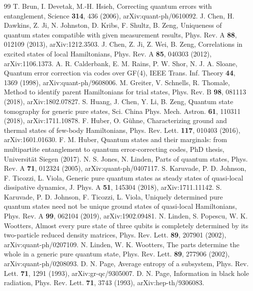 \documentclass[aps,pra,onecolumn,superscriptaddress,nofootinbib,longbibliography,10pt]{revtex4-2}
\theoremstyle{definition}
\begin{document}
\begin{thebibliography}{99}
 T. Brun, I. Devetak, M.-H. Hsieh, Correcting quantum errors with entanglement, Science \textbf{314}, 436 (2006), arXiv:quant-ph/0610092.
 J. Chen, H. Dawkins, Z. Ji, N. Johnston, D. Kribs, F. Shultz, B. Zeng, Uniqueness of quantum states compatible with given measurement results, Phys. Rev. A \textbf{88}, 012109 (2013), arXiv:1212.3503.
 J. Chen, Z. Ji, Z. Wei, B. Zeng, Correlations in excited states of local Hamiltonians, Phys. Rev. A \textbf{85}, 040303 (2012), arXiv:1106.1373.
 A. R. Calderbank, E. M. Rains, P. W. Shor, N. J. A. Sloane, Quantum error correction via codes over GF(4), IEEE Trans. Inf. Theory \textbf{44}, 1369 (1998), arXiv:quant-ph/9608006.
 M. Greiter, V. Schnells, R. Thomale, Method to identify parent Hamiltonians for trial states, Phys. Rev. B \textbf{98}, 081113 (2018), arXiv:1802.07827.
 S. Huang, J. Chen, Y. Li, B. Zeng, Quantum state tomography for generic pure states, Sci. China Phys. Mech. Astron. \textbf{61}, 110311 (2018), arXiv:1711.10878.
 F. Huber, O. Gühne, Characterizing ground and thermal states of few-body Hamiltonians, Phys. Rev. Lett. \textbf{117}, 010403 (2016), arXiv:1601.01630.
 F. M. Huber, Quantum states and their marginals: from multipartite entanglement to quantum error-correcting codes, PhD thesis, Universität Siegen (2017).
 N. S. Jones, N. Linden, Parts of quantum states, Phys. Rev. A \textbf{71}, 012324 (2005), arXiv:quant-ph/0407117.
 S. Karuvade, P. D. Johnson, F. Ticozzi, L. Viola, Generic pure quantum states as steady states of quasi-local dissipative dynamics, J. Phys. A \textbf{51}, 145304 (2018), arXiv:1711.11142.
 S. Karuvade, P. D. Johnson, F. Ticozzi, L. Viola, Uniquely determined pure quantum states need not be unique ground states of quasi-local Hamiltonians, Phys. Rev. A \textbf{99}, 062104 (2019), arXiv:1902.09481.
 N. Linden, S. Popescu, W. K. Wootters, Almost every pure state of three qubits is completely determined by its two-particle reduced density matrices, Phys. Rev. Lett. \textbf{89}, 207901 (2002), arXiv:quant-ph/0207109.
 N. Linden, W. K. Wootters, The parts determine the whole in a generic pure quantum state, Phys. Rev. Lett. \textbf{89}, 277906 (2002), arXiv:quant-ph/0208093.
 D. N. Page, Average entropy of a subsystem, Phys. Rev. Lett. \textbf{71}, 1291 (1993), arXiv:gr-qc/9305007.
 D. N. Page, Information in black hole radiation, Phys. Rev. Lett. \textbf{71}, 3743 (1993), arXiv:hep-th/9306083.

\end{thebibliography}
\end{document}
